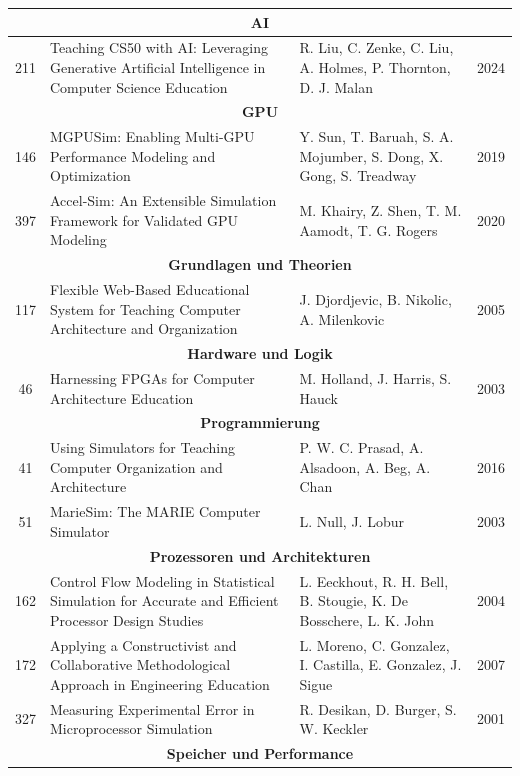 \begin{longtable}{|c|p{6cm}|p{3cm}|c|}
    \multicolumn{4}{c}{\textbf{AI}} \\
    \hline
    211 & Teaching CS50 with AI: Leveraging Generative Artificial Intelligence in Computer Science Education & R. Liu, C. Zenke, C. Liu, A. Holmes, P. Thornton, D. J. Malan & 2024 \\
    \hline
    \multicolumn{4}{c}{\textbf{GPU}} \\
    \hline
    146 & MGPUSim: Enabling Multi-GPU Performance Modeling and Optimization & Y. Sun, T. Baruah, S. A. Mojumber, S. Dong, X. Gong, S. Treadway & 2019 \\
    397 & Accel-Sim: An Extensible Simulation Framework for Validated GPU Modeling & M. Khairy, Z. Shen, T. M. Aamodt, T. G. Rogers & 2020 \\
    \hline
    \multicolumn{4}{c}{\textbf{Grundlagen und Theorien}} \\
    \hline
    117 & Flexible Web-Based Educational System for Teaching Computer Architecture and Organization & J. Djordjevic, B. Nikolic, A. Milenkovic & 2005 \\
    \hline
    \multicolumn{4}{c}{\textbf{Hardware und Logik}} \\
    \hline
    46 & Harnessing FPGAs for Computer Architecture Education & M. Holland, J. Harris, S. Hauck & 2003 \\
    \hline
    \multicolumn{4}{c}{\textbf{Programmierung}} \\
    \hline
    41 & Using Simulators for Teaching Computer Organization and Architecture & P. W. C. Prasad, A. Alsadoon, A. Beg, A. Chan & 2016 \\
    51 & MarieSim: The MARIE Computer Simulator & L. Null, J. Lobur & 2003 \\
    \hline
    \multicolumn{4}{c}{\textbf{Prozessoren und Architekturen}} \\
    \hline
    162 & Control Flow Modeling in Statistical Simulation for Accurate and Efficient Processor Design Studies & L. Eeckhout, R. H. Bell, B. Stougie, K. De Bosschere, L. K. John & 2004 \\
    172 & Applying a Constructivist and Collaborative Methodological Approach in Engineering Education & L. Moreno, C. Gonzalez, I. Castilla, E. Gonzalez, J. Sigue & 2007 \\
    327 & Measuring Experimental Error in Microprocessor Simulation & R. Desikan, D. Burger, S. W. Keckler & 2001 \\
    \hline
    \multicolumn{4}{c}{\textbf{Speicher und Performance}} \\

\end{longtable}
